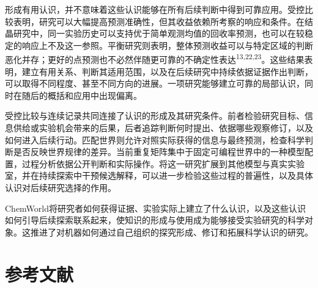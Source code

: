 \documentclass[10pt,a4paper]{article}
\begin{document}
形成有用认识，并不意味着这些认识能够在所有后续判断中得到可靠应用。受控比较表明，研究可以大幅提高预测准确性，但其收益依赖所考察的响应和条件。在结晶研究中，同一实验历史可以支持优于简单观测均值的回收率预测，也可以在较稳定的响应上不及这一参照。平衡研究则表明，整体预测收益可以与特定区域的判断恶化并存；更好的点预测也不必然伴随更可靠的不确定性表达\textsuperscript{13,22,23}。这些结果表明，建立有用关系、判断其适用范围，以及在后续研究中持续依据证据作出判断，可以取得不同程度、甚至不同方向的进展。一项研究能够建立可靠的局部认识，同时在随后的概括和应用中出现偏离。

受控比较与连续记录共同连接了认识的形成及其研究条件。前者检验研究目标、信息供给或实验机会带来的后果，后者追踪判断何时提出、依据哪些观察修订，以及如何进入后续行动。匹配世界则允许对照实际获得的信息与最终预测，检查科学判断是否反映世界规律的差异。当前重复矩阵集中于固定可编程世界中的一种模型配置，过程分析依据公开判断和实际操作。将这一研究扩展到其他模型与真实实验室，并在持续探索中干预候选解释，可以进一步检验这些过程的普遍性，以及具体认识对后续研究选择的作用。

ChemWorld将研究者如何获得证据、实验实际上建立了什么认识，以及这些认识如何引导后续探索联系起来，使知识的形成与使用成为能够接受实验研究的科学对象。这推进了对机器如何通过自己组织的探究形成、修订和拓展科学认识的研究。

\clearpage
\onecolumn

\section{参考文献}\label{ux53c2ux8003ux6587ux732e}
\end{document}
